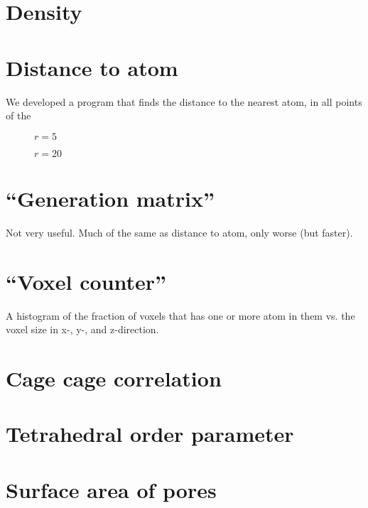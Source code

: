 \section{Density}
\section{Distance to atom}
We developed a program that finds the distance to the nearest atom, in all points of the 
\begin{figure}[h!]
    \centering
    
    \caption{$r = 5$ \Ang}
    \label{fig:distance_to_atom_r05}
\end{figure}

\begin{figure}[h!]
    \centering
    
    \caption{$r = 20$ \Ang}
    \label{fig:distance_to_atom_r20}
\end{figure}

\section{``Generation matrix''}
    Not very useful. Much of the same as distance to atom, only worse (but faster).
\section{``Voxel counter''}
    A histogram of the fraction of voxels that has one or more atom in them vs. the voxel size in x-, y-, and z-direction.
\section{Cage cage correlation}
\section{Tetrahedral order parameter}
\section{Surface area of pores}